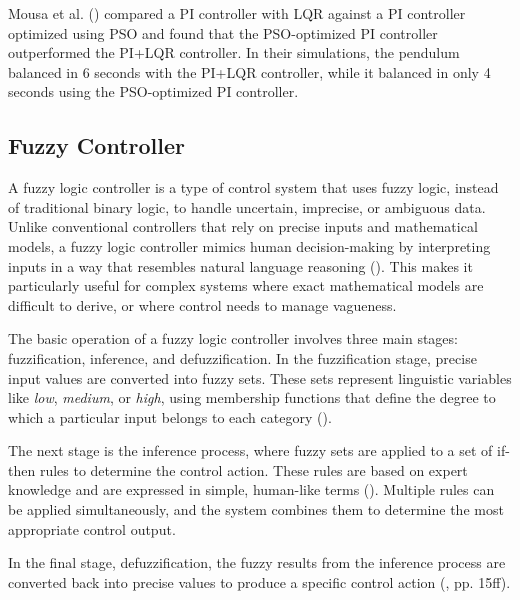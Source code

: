 Mousa et al. (\citeyear{mousa_stabilizing_2015}) compared a PI controller with LQR against a PI controller optimized using PSO and found that the PSO-optimized PI controller outperformed the PI+LQR controller. In their simulations, the pendulum balanced in 6 seconds with the PI+LQR controller, while it balanced in only 4 seconds using the PSO-optimized PI controller.

\subsection{Fuzzy Controller}

A fuzzy logic controller is a type of control system that uses fuzzy logic, instead of traditional binary logic, to handle uncertain, imprecise, or ambiguous data. Unlike conventional controllers that rely on precise inputs and mathematical models, a fuzzy logic controller mimics human decision-making by interpreting inputs in a way that resembles natural language reasoning (\cite{rehman_introduction_2017}). This makes it particularly useful for complex systems where exact mathematical models are difficult to derive, or where control needs to manage vagueness.

The basic operation of a fuzzy logic controller involves three main stages: fuzzification, inference, and defuzzification. In the fuzzification stage, precise input values are converted into fuzzy sets. These sets represent linguistic variables like \textit{low}, \textit{medium}, or \textit{high}, using membership functions that define the degree to which a particular input belongs to each category (\cite{liu_real-time_2009}).

The next stage is the inference process, where fuzzy sets are applied to a set of if-then rules to determine the control action. These rules are based on expert knowledge and are expressed in simple, human-like terms (\cite{dahiya_introduction_2016}). Multiple rules can be applied simultaneously, and the system combines them to determine the most appropriate control output.

In the final stage, defuzzification, the fuzzy results from the inference process are converted back into precise values to produce a specific control action (\cite{mahmoud_basics_2018}, pp. 15ff).

